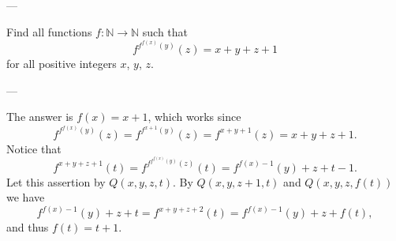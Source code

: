 
---

Find all functions $f:\mathbb N\to\mathbb N$ such that \[f^{f^{f(x)}(y)}(z)=x+y+z+1\]
for all positive integers $x$, $y$, $z$.

---

The answer is $f(x)=x+1$, which works since \[f^{f^{f(x)}(y)}(z)=f^{f^{x+1}(y)}(z)=f^{x+y+1}(z)=x+y+z+1.\]
Notice that \[f^{x+y+z+1}(t)=f^{f^{f^{f(x)}(y)}(z)}(t)=f^{f(x)-1}(y)+z+t-1.\]
Let this assertion by $Q(x,y,z,t)$. By $Q(x,y,z+1,t)$ and $Q(x,y,z,f(t))$ we have \[f^{f(x)-1}(y)+z+t=f^{x+y+z+2}(t)=f^{f(x)-1}(y)+z+f(t),\]
and thus $f(t)=t+1$.
